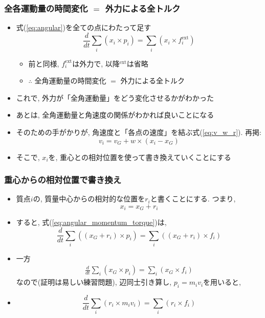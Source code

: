 \documentclass[10pt,dvipdfmx]{beamer}
\newcommand{\ao}[1]{{\color{blue}#1}}
\newcommand{\aka}[1]{{\color{red}#1}}
\begin{document}
\begin{frame}
\frametitle{全各運動量の時間変化 $=$ 外力による全トルク}
\begin{itemize}
\item [] 式(\ref{eq:angular})を全ての点にわたって足す
  \begin{equation}
\frac{d}{dt}\sum_i (x_i \times p_i) = \sum_i (x_i \times f^{\mbox{ext}}_i)
\label{eq:angular_momentum_torque}    
  \end{equation}
\begin{itemize}
\item 前と同様, $f^{\mbox{ext}}_i$は外力で, 以降${}^{\mbox{ext}}$は省略
\item $\therefore$ \ao{全角運動量の時間変化 $=$ 外力による全トルク}
\end{itemize}

\item これで, 外力が「全角運動量」をどう変化させるかがわかった
\item \aka{あとは, 全角運動量と角速度の関係がわかれば良い}ことになる
\item そのための手がかりが, 角速度と「各点の速度」を結ぶ式(\ref{eq:v_w_r}).
再掲:
\[ v_i = v_G + w \times (x_i - x_G) \]
\item そこで, $x_i$を, 重心との相対位置を使って書き換えていくことにする
\end{itemize}
\end{frame}

\begin{frame}
\frametitle{重心からの相対位置で書き換え}
\begin{itemize}
\item [] 質点$i$の, 質量中心からの相対的な位置を$r_i$と書くことにする. つまり,
\[ x_i = x_G + r_i \]
\item [] すると, 式(\ref{eq:angular_momentum_torque})は,
\[ \frac{d}{dt}\sum_i ((x_G + r_i) \times p_i) = \sum_i ((x_G + r_i) \times f_i) \]
\item [] 一方
\begin{eqnarray*}
\frac{d}{dt}\sum_i (x_G \times p_i) = \sum_i (x_G \times f_i )
\end{eqnarray*}
なので(証明は易しい練習問題), 辺同士引き算し, $p_i = m_i v_i$を用いると,
\item []
\[ \frac{d}{dt} \sum_i (r_i \times m_i v_i) = \sum_i (r_i \times f_i) \]
\end{itemize}
\end{frame}
\end{document}
